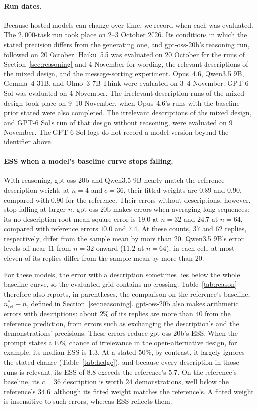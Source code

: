 \paragraph{Run dates.}
Because hosted models can change over time, we record when each was evaluated. The $2{,}000$-task run took place on 2--3 October 2026. Its conditions in which the stated precision differs from the generating one, and gpt-oss-20b's reasoning run, followed on 20 October. Haiku~5.5 was evaluated on 20 October for the runs of Section~\ref{sec:reasoning} and 4 November for wording, the relevant descriptions of the mixed design, and the message-sorting experiment. Opus~4.6, Qwen3.5 9B, Gemma~4 31B, and Olmo~3 7B Think were evaluated on 3--4 November. GPT-6 Sol was evaluated on 4 November. The irrelevant-description runs of the mixed design took place on 9--10 November, when Opus~4.6's runs with the baseline prior stated were also completed. The irrelevant descriptions of the mixed design, and GPT-6 Sol's run of that design without reasoning, were evaluated on 9 November. The GPT-6 Sol logs do not record a model version beyond the identifier above.

\paragraph{ESS when a model's baseline curve stops falling.}
With reasoning, gpt-oss-20b and Qwen3.5 9B nearly match the reference description weight: at $n=4$ and $c=36$, their fitted weights are $0.89$ and $0.90$, compared with $0.90$ for the reference. Their errors without descriptions, however, stop falling at larger $n$. gpt-oss-20b makes errors when averaging long sequences: its no-description root-mean-square error is $19.0$ at $n=32$ and $24.7$ at $n=64$, compared with reference errors $10.0$ and $7.4$. At these counts, $37$ and $62$ replies, respectively, differ from the sample mean by more than $20$. Qwen3.5 9B's error levels off near $11$ from $n=32$ onward ($11.2$ at $n=64$); in each cell, at most eleven of its replies differ from the sample mean by more than $20$.

For these models, the error with a description sometimes lies below the whole baseline curve, so the evaluated grid contains no crossing. Table~\ref{tab:reason} therefore also reports, in parentheses, the comparison on the reference's baseline, $n^*_{\mathrm{ref}}-n$, defined in Section~\ref{sec:reasoning}. gpt-oss-20b also makes arithmetic errors with descriptions: about $2\%$ of its replies are more than $40$ from the reference prediction, from errors such as exchanging the description's and the demonstrations' precisions. These errors reduce gpt-oss-20b's ESS. When the prompt states a $10\%$ chance of irrelevance in the open-alternative design, for example, its median ESS is $1.3$. At a stated $50\%$, by contrast, it largely ignores the stated chance (Table~\ref{tab:hedge}), and because every description in those runs is relevant, its ESS of $8.8$ exceeds the reference's $5.7$. On the reference's baseline, its $c = 36$ description is worth $24$ demonstrations, well below the reference's $34.6$, although its fitted weight matches the reference's. A fitted weight is insensitive to such errors, whereas ESS reflects them.

